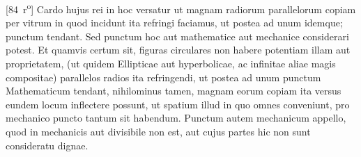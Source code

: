 [84~r\textsuperscript{o}]  Cardo hujus rei in hoc versatur ut magnam radiorum parallelorum copiam per vitrum in quod incidunt ita refringi faciamus, ut postea ad unum idemque; punctum tendant. Sed punctum hoc aut mathematice aut mechanice considerari potest. Et quamvis certum sit, figuras circulares non habere potentiam illam aut proprietatem,  (ut quidem Ellipticae aut hyperbolicae, ac infinitae aliae  magis compositae) parallelos radios ita refringendi, ut  postea ad unum punctum Mathematicum\protect{} tendant, nihilominus tamen, magnam eorum copiam ita versus eundem  locum inflectere possunt, ut spatium illud in quo omnes  conveniunt, pro mechanico puncto\protect{} tantum sit habendum. Punctum autem mechanicum\protect{} appello, quod in mechanicis  aut divisibile non est, aut cujus partes hic non sunt  consideratu dignae.\pend
 
                     